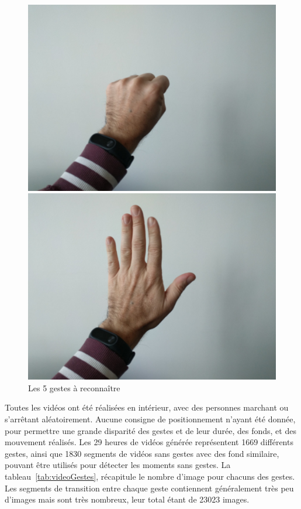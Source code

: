 \begin{figure}[htb]
\begin{minipage}[c]{0.3\linewidth}
   \end{minipage} \\
   \vspace{1em}
   \begin{minipage}[c]{0.3\linewidth}
      \includegraphics[width=0.95\linewidth]{figures/4.jpg}
   \end{minipage}   
   \begin{minipage}[c]{0.3\linewidth}
      \includegraphics[width=0.95\linewidth]{figures/5.jpg}
   \end{minipage}   
   \caption{Les 5 gestes à reconnaître}
   \label{fig:gestures}
\end{figure}

Toutes les vidéos ont été réalisées en intérieur, avec des personnes marchant ou s'arrêtant aléatoirement.
Aucune consigne de positionnement n'ayant été donnée, pour permettre une grande disparité des gestes et de leur durée, des fonds, et des mouvement réalisés.
Les 29 heures de vidéos générée représentent 1669 différents gestes, ainsi que 1830 segments de vidéos sans gestes avec des fond similaire, pouvant être utilisés pour détecter les moments sans gestes.
La tableau~\ref{tab:videoGestes}, récapitule le nombre d'image pour chacuns des gestes.
Les segments de transition entre chaque geste contiennent généralement très peu d'images mais sont très nombreux, leur total étant de 23023 images.


